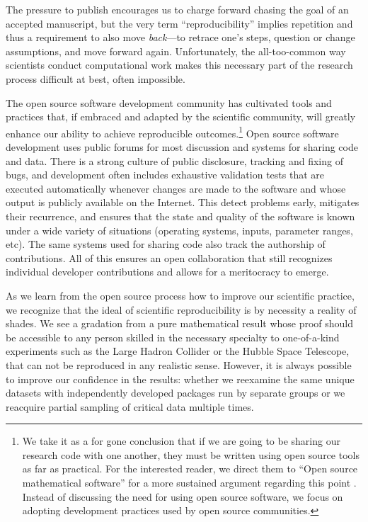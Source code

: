\documentclass[ChapterTOCs,krantz2]{krantz} %
\begin{document}
The pressure to publish encourages us to charge forward chasing the goal of an
accepted manuscript, but the very term ``reproducibility'' implies repetition
and thus a requirement to also move \emph{back}---to retrace one's steps,
question or change assumptions, and move forward again. Unfortunately, the
all-too-common way scientists conduct computational work makes this necessary
part of the research process difficult at best, often impossible.

The open source software development community has cultivated tools and
practices that, if embraced and adapted by the scientific community, will
greatly enhance our ability to achieve reproducible outcomes.\footnote{We take
  it as a for gone conclusion that if we are going to be sharing our research
  code with one another, they must be written using open source tools as far as
  practical. For the interested reader, we direct them to ``Open source
  mathematical software'' for a more sustained argument regarding this point
  \cite{joyner2007open}. Instead of discussing the need for using open source
  software, we focus on adopting development practices used by open source
  communities.}  Open source software development uses public forums for most
discussion and systems for sharing code and data. There is a strong culture of
public disclosure, tracking and fixing of bugs, and development often includes
exhaustive validation tests that are executed automatically whenever changes
are made to the software and whose output is publicly available on the
Internet. This detect problems early, mitigates their
recurrence, and ensures that the state and quality of the software is known
under a wide variety of situations (operating systems, inputs,
parameter ranges, etc).  The same systems used for
sharing code also track the authorship of contributions. All of this ensures
an open collaboration that still recognizes
individual developer contributions and allows for a meritocracy to emerge.

As we learn from the open source process how to improve our scientific practice, we
recognize that the ideal of scientific reproducibility is by necessity a
reality of shades. We see a gradation from a pure mathematical result whose
proof should be accessible to any person skilled in the necessary specialty to
one-of-a-kind experiments such as the Large Hadron Collider or the Hubble Space
Telescope, that can not be reproduced in any realistic sense. However, it is
always possible to improve our confidence in the results: whether we reexamine
the same unique datasets with independently developed packages run by separate
groups or we reacquire partial sampling of critical data multiple times.
\end{document}
